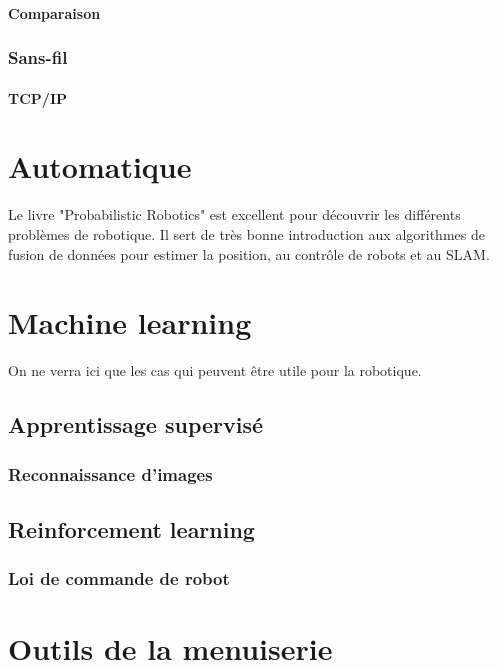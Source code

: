 \documentclass[a4paper, 11pt]{report}
\begin{document}
\subsection{Comparaison}

\section{Sans-fil}

\subsection{TCP/IP}

\part{Automatique}

Le livre "Probabilistic Robotics" est excellent pour découvrir les différents problèmes de robotique. Il sert de très bonne introduction aux algorithmes de fusion de données pour estimer la position, au contrôle de robots et au SLAM.

\part{Machine learning}
On ne verra ici que les cas qui peuvent être utile pour la robotique.

\chapter{Apprentissage supervisé}

\section{Reconnaissance d'images}

\chapter{Reinforcement learning}

\section{Loi de commande de robot}

\part{Outils de la menuiserie}
\end{document}
